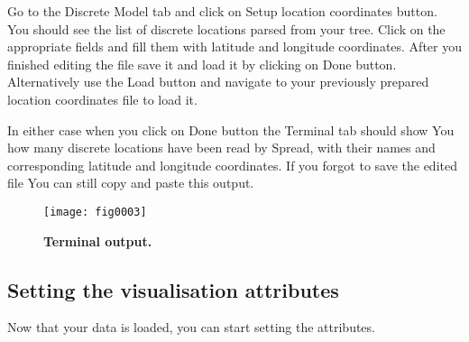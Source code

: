 Go to the Discrete Model tab and click on Setup location coordinates
button. You should see the list of discrete locations parsed from
your tree. Click on the appropriate fields and fill them with latitude
and longitude coordinates. After you finished editing the file save
it and load it by clicking on Done button. Alternatively use the Load
button and navigate to your previously prepared location coordinates
file to load it. 

In either case when you click on Done button the Terminal tab should
show You how many discrete locations have been read by Spread, with
their names and corresponding latitude and longitude coordinates.
If you forgot to save the edited file You can still copy and paste
this output.

\begin{figure}[H]
\begin{centering}
\texttt{[image: fig0003]}
\caption{
{ \footnotesize 
{\bf Terminal output.}
} %
}
\label{fig:0003}
\par\end{centering}
\end{figure}

\subsection{Setting the visualisation attributes}

Now that your data is loaded, you can start setting the attributes.

